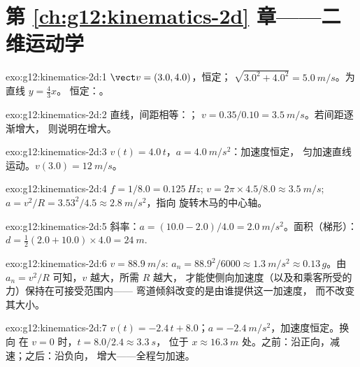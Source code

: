 \section*{第 \ref{ch:g12:kinematics-2d} 章——二维运动学}

\begin{solution}{exo:g12:kinematics-2d:1}
$\vect v = (3.0, 4.0)$，恒定； $\sqrt{3.0^2 + 4.0^2} =
\qty{5.0}{m/s}$。为直线 $y = \tfrac43 x$。
恒定：。
\end{solution}

\begin{solution}{exo:g12:kinematics-2d:2}
直线，间距相等：；
$v = 0.35/0.10 = \qty{3.5}{m/s}$。若间距逐渐增大，
则说明在增大。
\end{solution}

\begin{solution}{exo:g12:kinematics-2d:3}
$v(t) = 4.0\,t$，$a = \qty{4.0}{m/s^2}$：加速度恒定，
匀加速直线运动。$v(3.0) = \qty{12}{m/s}$。
\end{solution}

\begin{solution}{exo:g12:kinematics-2d:4}
$f = 1/8.0 = \qty{0.125}{Hz}$;
$v = 2\pi \times 4.5/8.0 \approx \qty{3.5}{m/s}$;
$a = v^2/R = 3.53^2/4.5 \approx \qty{2.8}{m/s^2}$，指向
旋转木马的中心轴。
\end{solution}

\begin{solution}{exo:g12:kinematics-2d:5}
斜率：$a = (10.0 - 2.0)/4.0 = \qty{2.0}{m/s^2}$。面积（梯形）：
$d = \tfrac12 (2.0 + 10.0) \times 4.0 = \qty{24}{m}$.
\end{solution}

\begin{solution}{exo:g12:kinematics-2d:6}
$v = \qty{88.9}{m/s}$: $a_n = 88.9^2/6000 \approx \qty{1.3}{m/s^2}
\approx 0.13\,g$。由 $a_n = v^2/R$ 可知，$v$ 越大，所需 $R$ 越大，
才能使侧向加速度（以及和乘客所受的力）保持在可接受范围内——
弯道倾斜改变的是由谁提供这一加速度，
而不改变其大小。
\end{solution}

\begin{solution}{exo:g12:kinematics-2d:7}
$v(t) = -2.4\,t + 8.0$；$a = \qty{-2.4}{m/s^2}$，加速度恒定。换向
在 $v = 0$ 时，$t = 8.0/2.4 \approx \qty{3.3}{s}$，
位于 $x \approx \qty{16.3}{m}$ 处。之前：沿正向，减速；之后：沿负向，
增大——全程匀加速。
\end{solution}

